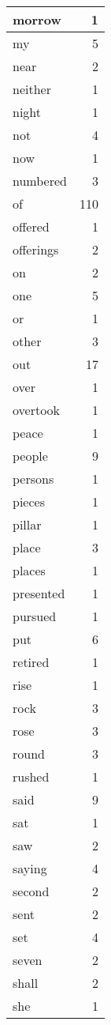 \begin{center}
\begin{longtable}{l|r}
morrow & 1 \\ \hline
my & 5 \\ \hline
near & 2 \\ \hline
neither & 1 \\ \hline
night & 1 \\ \hline
not & 4 \\ \hline
now & 1 \\ \hline
numbered & 3 \\ \hline
of & 110 \\ \hline
offered & 1 \\ \hline
offerings & 2 \\ \hline
on & 2 \\ \hline
one & 5 \\ \hline
or & 1 \\ \hline
other & 3 \\ \hline
out & 17 \\ \hline
over & 1 \\ \hline
overtook & 1 \\ \hline
peace & 1 \\ \hline
people & 9 \\ \hline
persons & 1 \\ \hline
pieces & 1 \\ \hline
pillar & 1 \\ \hline
place & 3 \\ \hline
places & 1 \\ \hline
presented & 1 \\ \hline
pursued & 1 \\ \hline
put & 6 \\ \hline
retired & 1 \\ \hline
rise & 1 \\ \hline
rock & 3 \\ \hline
rose & 3 \\ \hline
round & 3 \\ \hline
rushed & 1 \\ \hline
said & 9 \\ \hline
sat & 1 \\ \hline
saw & 2 \\ \hline
saying & 4 \\ \hline
second & 2 \\ \hline
sent & 2 \\ \hline
set & 4 \\ \hline
seven & 2 \\ \hline
shall & 2 \\ \hline
she & 1 \\ \hline

\end{longtable}
\end{center}
